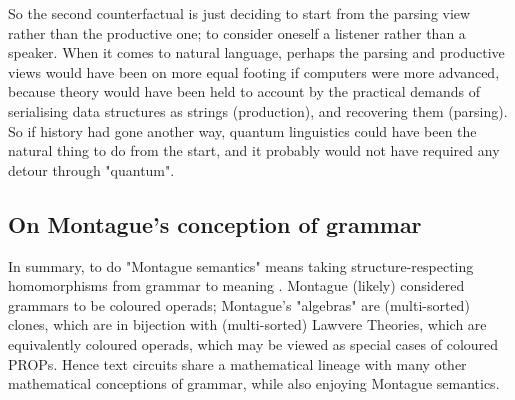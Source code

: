So the second counterfactual is just deciding to start from the parsing view rather than the productive one; to consider oneself a listener rather than a speaker. When it comes to natural language, perhaps the parsing and productive views would have been on more equal footing if computers were more advanced, because theory would have been held to account by the practical demands of serialising data structures as strings (production), and recovering them (parsing).\\

So if history had gone another way, quantum linguistics could have been the natural thing to do from the start, and it probably would not have required any detour through "quantum".

\subsection{On Montague's conception of grammar}\label{sec:monty}


In summary, to do "Montague semantics" means taking structure-respecting homomorphisms from grammar to meaning \citep{janssen_montague_2021}. Montague (likely) considered grammars to be coloured operads; Montague's "algebras" are (multi-sorted) clones, which are in bijection with (multi-sorted) Lawvere Theories, which are equivalently coloured operads, which may be viewed as special cases of coloured PROPs. Hence text circuits share a mathematical lineage with many other mathematical conceptions of grammar, while also enjoying Montague semantics.\\

